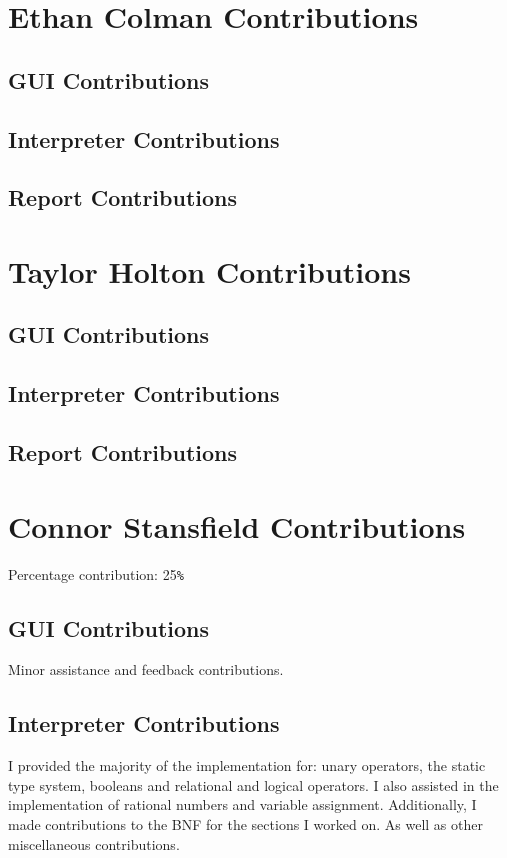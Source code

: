 \documentclass[a4paper, oneside, 11pt]{report}
\begin{document}
    \section{Ethan Colman Contributions}
    \subsection{GUI Contributions}
    \subsection{Interpreter Contributions}
    \subsection{Report Contributions}

    \section{Taylor Holton Contributions}
    \subsection{GUI Contributions}
    \subsection{Interpreter Contributions}
    \subsection{Report Contributions}

    \section{Connor Stansfield Contributions}
    Percentage contribution: 25\verb|%|
    \subsection{GUI Contributions}
    Minor assistance and feedback contributions.
    \subsection{Interpreter Contributions}
    I provided the majority of the implementation for: unary operators, the static type system, booleans and relational and logical operators.
    I also assisted in the implementation of rational numbers and variable assignment.
    Additionally, I made contributions to the BNF for the sections I worked on.
    As well as other miscellaneous contributions.
\end{document}
